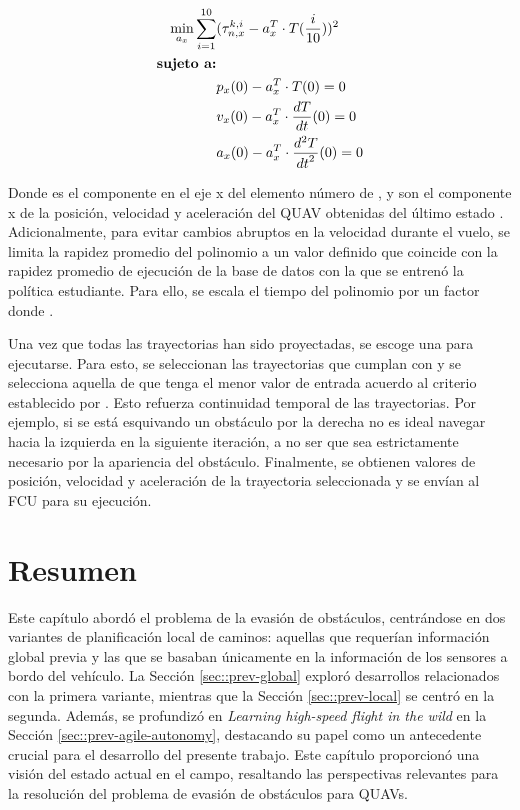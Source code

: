 \begin{equation}
\label{eq:aoa-traj-proj}
\begin{split}
    \min_{a_x} \sum_{i=1}^{10} & (\tau_{n,x}^{k,i} - a_x^T \cdot T(\frac{i}{10}))^{2} \\
    \text{\textbf{sujeto a:}} & \\
                     & p_x(0) - a_x^T \cdot T(0) = 0 \\
                     & v_x(0) - a_x^T \cdot \frac{dT}{dt}(0) = 0 \\
                     & a_x(0) - a_x^T \cdot \frac{d^2 T}{{dt}^2}(0) = 0 \\
\end{split}
\end{equation}

Donde  es el componente en el eje x del elemento número  de , y  son el componente x de la posición, velocidad y aceleración del QUAV obtenidas del último estado . Adicionalmente, para evitar cambios abruptos en la velocidad durante el vuelo, se limita la rapidez promedio del polinomio a un valor definido  que coincide con la rapidez promedio de ejecución de la base de datos con la que se entrenó la política estudiante. Para ello, se escala el tiempo  del polinomio  por un factor  donde .

Una vez que todas las trayectorias han sido proyectadas, se escoge una para ejecutarse. Para esto, se seleccionan las trayectorias que cumplan con  y se selecciona aquella de que tenga el menor valor de entrada acuerdo al criterio establecido por \cite{mellinger2011minimum}. Esto refuerza continuidad temporal de las trayectorias. Por ejemplo, si se está esquivando un obstáculo por la derecha no es ideal navegar hacia la izquierda en la siguiente iteración, a no ser que sea estrictamente necesario por la apariencia del obstáculo. Finalmente, se obtienen valores de posición, velocidad y aceleración de la trayectoria seleccionada y se envían al FCU para su ejecución.

\section{Resumen}

Este capítulo abordó el problema de la evasión de obstáculos, centrándose en dos variantes de planificación local de caminos: aquellas que requerían información global previa y las que se basaban únicamente en la información de los sensores a bordo del vehículo. La Sección \ref{sec::prev-global} exploró desarrollos relacionados con la primera variante, mientras que la Sección \ref{sec::prev-local} se centró en la segunda. Además, se profundizó en \textit{Learning high-speed flight in the wild} en la Sección \ref{sec::prev-agile-autonomy}, destacando su papel como un antecedente crucial para el desarrollo del presente trabajo. Este capítulo proporcionó una visión del estado actual en el campo, resaltando las perspectivas relevantes para la resolución del problema de evasión de obstáculos para QUAVs.

